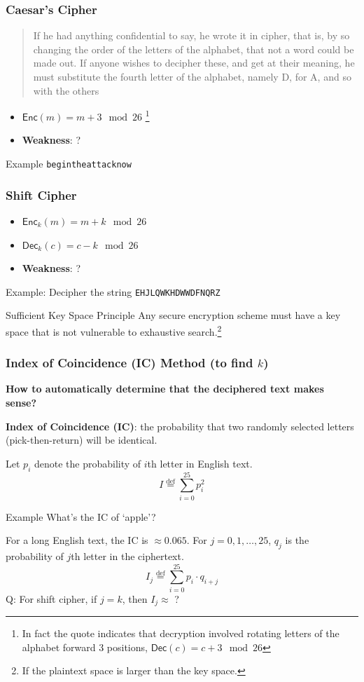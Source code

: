 \begin{frame}[fragile]\frametitle{Caesar's Cipher}
\begin{quote}
If he had anything confidential to say, he wrote it in cipher, that is, by so changing the order of the letters of the alphabet, that not a word could be made out. If anyone wishes to \alert{decipher} these, and get at their meaning, he must \alert{substitute the fourth letter of the alphabet, namely D, for A}, and so with the others

\end{quote}
\begin{itemize}
	\item $\mathsf{Enc}(m)=m+3\mod 26$ \footnote{In fact the quote indicates that decryption involved rotating letters of the alphabet forward 3 positions, $\mathsf{Dec}(c)=c+3\mod 26$}
	\item \textbf{Weakness}: ? %
\end{itemize}
\begin{exampleblock}{Example}
\verb|begintheattacknow|
\end{exampleblock}
\end{frame}
\begin{frame}[fragile]\frametitle{Shift Cipher}
\begin{itemize}
\item $\mathsf{Enc}_k(m)=m+k\mod 26$
\item $\mathsf{Dec}_k(c)=c-k\mod 26$
\item \textbf{Weakness}: ? %
\end{itemize}
\begin{exampleblock}{Example: Decipher the string}	
\verb|EHJLQWKHDWWDFNQRZ|
\end{exampleblock}
\begin{alertblock}{Sufficient Key Space Principle}
Any secure encryption scheme must have a key space that is not vulnerable to exhaustive search.\footnote{If the plaintext space is larger than the key space.}
\end{alertblock}
\end{frame}
\begin{frame}\frametitle{Index of Coincidence (IC) Method (to find $k$)}
\textbf{How to automatically determine that the deciphered text makes sense?}

\textbf{Index of Coincidence (IC)}: the probability that two randomly selected letters (pick-then-return) will be identical.

Let $p_i$ denote the probability of $i$th letter in English text.
\[I \overset{\text{def}}{=}\sum_{i=0}^{25} p_i^2 \]
\begin{exampleblock}{Example}
What's the IC of `apple'?
\end{exampleblock}

For a long English text, the IC is $\approx 0.065$.
For $j = 0, 1, \dotsc , 25$, $q_j$ is the probability of $j$th letter in the ciphertext.
\[I_j \overset{\text{def}}{=}\sum_{i=0}^{25} p_i \cdot q_{i+j}\]
\alert{Q: For shift cipher, if $j = k$, then $I_j \approx$ ?}
\end{frame}

